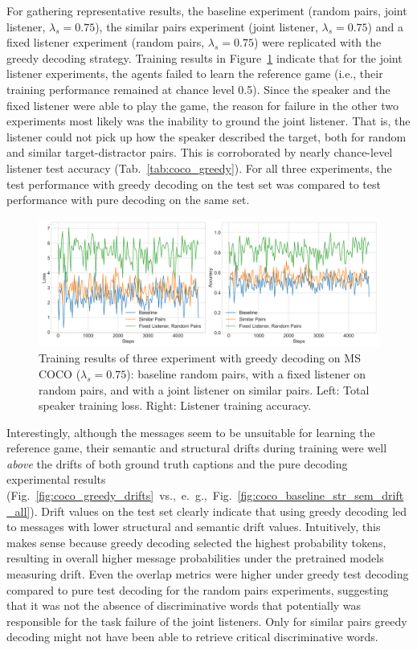 For gathering representative results, the baseline experiment (random pairs, joint listener, $\lambda_s=0.75$), the similar pairs experiment (joint listener, $\lambda_s=0.75$) and a fixed listener experiment (random pairs, $\lambda_s=0.75$) were replicated with the greedy decoding strategy. Training results in Figure~\ref{fig:coco_greedy_baseline} indicate that for the joint listener experiments, the agents failed to learn the reference game (i.e., their training performance remained at chance level 0.5). Since the speaker and the fixed listener were able to play the game, the reason for failure in the other two experiments most likely was the inability to ground the joint listener. That is, the listener could not pick up how the speaker described the target, both for random and similar target-distractor pairs. This is corroborated by nearly chance-level listener test accuracy (Tab.~\ref{tab:coco_greedy}). For all three experiments, the test performance with greedy decoding on the test set was compared to test performance with pure decoding on the same set. 
\begin{figure}
	\centering
	\includegraphics[width=\linewidth]{images/coco_greedy_all_075_losses.png}
	\caption{Training results of three experiment with greedy decoding on MS COCO ($\lambda_s = 0.75$): baseline random pairs, with a fixed listener on random pairs, and with a joint listener on similar pairs. Left: Total speaker training loss. Right: Listener training accuracy.}
	\label{fig:coco_greedy_baseline}
\end{figure} 
Interestingly, although the messages seem to be unsuitable for learning the reference game, their semantic and structural drifts during training were well \emph{above} the drifts of both ground truth captions and the pure decoding experimental results (Fig.~\ref{fig:coco_greedy_drifts}~vs.,~e.~g.,~Fig.~\ref{fig:coco_baseline_str_sem_drift_all}). Drift values on the test set clearly indicate that using greedy decoding led to messages with lower structural and semantic drift values. Intuitively, this makes sense because greedy decoding selected the highest probability tokens, resulting in overall higher message probabilities under the pretrained models measuring drift. Even the overlap metrics were higher under greedy test decoding compared to pure test decoding for the random pairs experiments, suggesting that it was not the absence of discriminative words that potentially was responsible for the task failure of the joint listeners. Only for similar pairs greedy decoding might not have been able to retrieve critical discriminative words.

